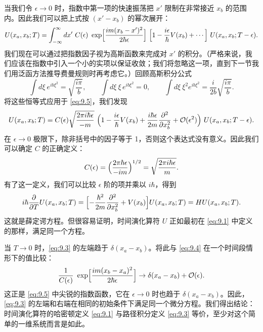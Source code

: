 当我们令 $\epsilon\to 0$ 时，指数中第一项的快速振荡把 $x'$ 限制在非常接近 $x_b$ 的范围内。因此我们可以把上式按 $(x'-x_b)$ 的幂次展开：
\begin{equation}
  U(x_a, x_b; T) = \int_{-\infty}^{\infty} dx'\ C(\epsilon)\
    \exp\Bigl[ \frac{im(x_b-x')^2}{2\hbar\epsilon} \Bigr]\
    \Bigl[ 1 - \frac{i\epsilon}{\hbar}V(x_b) + \cdots \Bigr]\
    U(x_a, x_b; T-\epsilon) .
  \label{eq:9.5}
\end{equation}
我们现在可以通过把指数因子视为高斯函数来完成对 $x'$ 的积分。（严格来说，我们应该在指数中引入一个小的实项以保证收敛；我们将忽略这一项，直到下一节我们用泛函方法推导费曼规则时再考虑它。）回顾高斯积分公式
\begin{equation}
  \int d\xi\ e^{i b\xi^2} = \sqrt{\frac{i\pi}{b}},\qquad
  \int d\xi\ \xi\,e^{i b\xi^2} = 0,\qquad
  \int d\xi\ \xi^2 e^{i b\xi^2} = \frac{i}{2b}\sqrt{\frac{i\pi}{b}} .
\end{equation}
将这些恒等式应用于 \eqref{eq:9.5}，我们发现
\begin{equation}
  U(x_a, x_b; T) = C(\epsilon)\sqrt{\frac{2\pi i\hbar\epsilon}{-m}}\
    \Bigl( 1 - \frac{i\epsilon}{\hbar}V(x_b) + \frac{i\hbar\epsilon}{2m}
      \frac{\partial^2}{\partial x_b^2} + \mathcal{O}(\epsilon^2) \Bigr)\
    U(x_a, x_b; T-\epsilon) .
\end{equation}
在 $\epsilon\to 0$ 极限下，除非括号中的因子等于 1，否则这个表达式没有意义。因此我们可以确定 $C$ 的正确定义：
\begin{equation}
  C(\epsilon) = \Bigl( \frac{2\pi\hbar\epsilon}{-im} \Bigr)^{1/2}
  = \sqrt{\frac{2\pi i\hbar\epsilon}{m}} .
  \label{eq:9.6}
\end{equation}
有了这一定义，我们可以比较 $\epsilon$ 阶的项并乘以 $i\hbar$，得到
\begin{equation}
  i\hbar\frac{\partial}{\partial T}U(x_a, x_b; T)
  = \Bigl[ -\frac{\hbar^2}{2m}\frac{\partial^2}{\partial x_b^2}
    + V(x_b) \Bigr]U(x_a, x_b; T)
  = H U(x_a, x_b; T) .
  \label{eq:9.7}
\end{equation}
这就是薛定谔方程。但很容易证明，时间演化算符 $U$ 正如最初在 \eqref{eq:9.1} 中定义的那样，满足同一个方程。

当 $T\to 0$ 时，\eqref{eq:9.3} 的左端趋于 $\delta(x_a-x_b)$。将此与 \eqref{eq:9.4} 在一个时间段情形下的值比较：
\begin{equation}
  \frac{1}{C(\epsilon)}\ \exp\Bigl[ \frac{im(x_b-x_a)^2}{2\hbar\epsilon}
    \Bigr] \to \delta(x_a-x_b) + \mathcal{O}(\epsilon) .
\end{equation}
这正是 \eqref{eq:9.5} 中尖锐的指数函数，它在 $\epsilon\to 0$ 时也趋于 $\delta(x_a-x_b)$。因此，\eqref{eq:9.3} 的左端和右端在相同的初始条件下满足同一个微分方程。我们得出结论：时间演化算符的哈密顿定义 \eqref{eq:9.1} 与路径积分定义 \eqref{eq:9.3} 等价，至少对这个简单的一维系统而言是如此。

